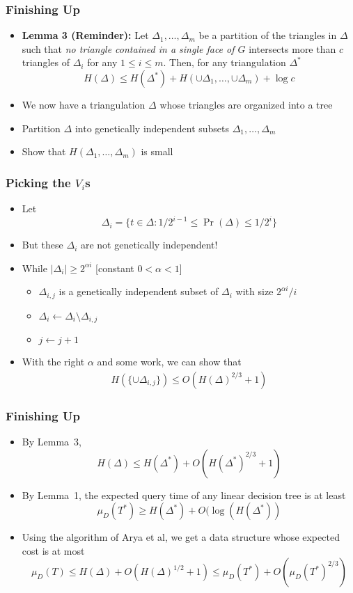 \documentclass{beamer}
\begin{document}
\frame
{
  \frametitle{Finishing Up}
  \begin{itemize}
      \item<1-> \textbf{Lemma 3 (Reminder):} Let $\Delta_1,\ldots,\Delta_m$ be a
partition of the triangles in $\Delta$ such that \emph{no triangle
contained in a single face of $G$}
intersects more than $c$ triangles of $\Delta_i$ for any $1\le i\le
m$. Then, for any triangulation $\Delta^*$
\[
      H(\Delta) \le H(\Delta^*) + H(\cup\Delta_1,\ldots,\cup\Delta_m) + \log c
\]

    \item<2-> We now have a triangulation $\Delta$ whose triangles are
organized into a tree
    \item<3-> Partition $\Delta$ into genetically independent subsets
$\Delta_1,\ldots,\Delta_m$ 
    \item<4-> Show that $H(\Delta_1,\ldots,\Delta_m)$ is small
  \end{itemize}
}

\frame
{
	\frametitle{Picking the $V_i$s}

	\begin{itemize}
	\item<1-> Let
	\[
		\Delta_i=\{t\in \Delta :1/2^{i-1} \le \Pr(\Delta) \le 1/2^i \}
	\]
	\item<2-> But these $\Delta_i$ are not genetically independent!
 	\item<3-> While $|\Delta_i|\ge 2^{\alpha i}$  [constant $0< \alpha
< 1$]
	   \begin{itemize}
		\item $\Delta_{i,j}$ is a genetically independent subset of
			$\Delta_i$ with size $2^{\alpha i}/i$
		\item $\Delta_i\gets \Delta_i\setminus \Delta_{i,j}$
		\item $j\gets j+1$
	   \end{itemize}
	\item<4-> With the right $\alpha$ and some work, we can show that
	\begin{eqnarray*}
	H(\{\cup\Delta_{i,j}\}) \le O(H(\Delta)^{2/3}+1)
	\end{eqnarray*}
	\end{itemize}
}


\frame
{
  \frametitle{Finishing Up}
  \begin{itemize}
    \item<1-> By Lemma~3, 
     \[ H(\Delta) \le H(\Delta^*) + O(H(\Delta^*)^{2/3}+1) \]
    \item<2-> By Lemma~1, the expected query time of any linear decision tree is at least
     \[ \mu_D(T^*) \ge H(\Delta^*) + O(\log (H(\Delta^*)) \]
    \item<3-> Using the algorithm of Arya et al, we get a data
structure whose expected cost is at most
     \[ \mu_D(T) \le H(\Delta) + O(H(\Delta)^{1/2}+1) \le \mu_D(T^*) + O(\mu_D(T^*)^{2/3}) \]
  \end{itemize}
}
\end{document}
